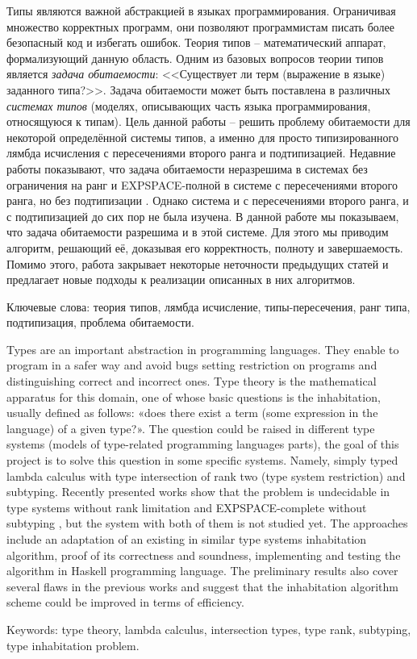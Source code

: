 \documentclass[../main.tex]{subfiles}
\begin{document}
Типы являются важной абстракцией в языках программирования. Ограничивая множество корректных программ, они позволяют программистам писать более безопасный код и избегать ошибок. Теория типов -- математический аппарат, формализующий данную область. Одним из базовых вопросов теории типов является {\it задача обитаемости}: <<Существует ли терм (выражение в языке) заданного типа?>>. Задача обитаемости может быть поставлена в различных {\it системах типов} (моделях, описывающих часть языка программирования, относящуюся к типам). Цель данной работы -- решить проблему обитаемости для некоторой определённой системы типов, а именно для просто типизированного лямбда исчисления с пересечениями второго ранга и подтипизацией. Недавние работы показывают, что задача обитаемости неразрешима в системах без ограничения на ранг \cite{urzyczyn_1997} и EXPSPACE-полной в системе с пересечениями второго ранга, но без подтипизации \cite{kusmierek_2007, urzyczyn_2009}. Однако система и с пересечениями второго ранга, и с подтипизацией до сих пор не была изучена. В данной работе мы показываем, что задача обитаемости разрешима и в этой системе. Для этого мы приводим алгоритм, решающий её, доказывая его корректность, полноту и завершаемость. Помимо этого, работа закрывает некоторые неточности предыдущих статей и предлагает новые подходы к реализации описанных в них алгоритмов.

\vspace*{\fill}

Ключевые слова: теория типов, лямбда исчисление, типы-пересечения, ранг типа, подтипизация, проблема обитаемости.


\newpage

Types are an important abstraction in programming languages. They enable to program in a safer way and avoid bugs setting restriction on programs and distinguishing correct and incorrect ones. Type theory is the mathematical apparatus for this domain, one of whose basic questions is the inhabitation, usually defined as follows: «does there exist a term (some expression in the language) of a given type?». The question could be raised in different type systems (models of type-related programming languages parts), the goal of this project is to solve this question in some specific systems. Namely, simply typed lambda calculus with type intersection of rank two (type system restriction) and subtyping. Recently presented works show that the problem is undecidable in type systems without rank limitation \cite{urzyczyn_1997} and EXPSPACE-complete without subtyping \cite{kusmierek_2007, urzyczyn_2009}, but the system with both of them is not studied yet. The approaches include an adaptation of an existing in similar type systems inhabitation algorithm, proof of its correctness and soundness, implementing and testing the algorithm in Haskell programming language. The preliminary results also cover several flaws in the previous works and suggest that the inhabitation algorithm scheme could be improved in terms of efficiency.

\vspace*{\fill}

Keywords: type theory, lambda calculus, intersection types, type rank, subtyping, type inhabitation problem.
\end{document}
